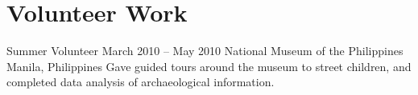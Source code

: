 \section*{Volunteer Work}

\volunteer
	{Summer Volunteer}
	{March 2010 -- May 2010}
	{National Museum of the Philippines}
	{Manila, Philippines}
	{Gave guided tours around the museum to street children, and completed data analysis of archaeological information.}

